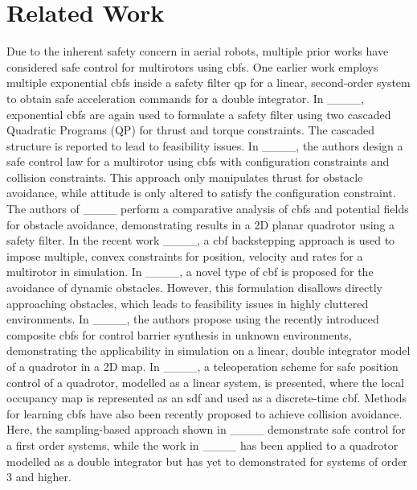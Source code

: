 \section{Related Work}
\label{sec:relatedwork}

Due to the inherent safety concern in aerial robots, multiple prior works have considered safe control for multirotors using \acp{cbf}. One earlier work employs multiple exponential \acp{cbf} inside a safety filter \ac{qp} for a linear, second-order system to obtain safe acceleration commands for a double integrator. In ____, exponential \acp{cbf} are again used to formulate a safety filter using two cascaded Quadratic Programs (QP) for thrust and torque constraints. The cascaded structure is reported to lead to feasibility issues. In ____, the authors design a safe control law for a multirotor using \acp{cbf} with configuration constraints and collision constraints. This approach only manipulates thrust for obstacle avoidance, while attitude is only altered to satisfy the configuration constraint.
The authors of ____ perform a comparative analysis of \acp{cbf} and potential fields for obstacle avoidance, demonstrating results in a 2D planar quadrotor using a safety filter.
In the recent work ____, a \ac{cbf} backstepping approach is used to impose multiple, convex constraints for position, velocity and rates for a multirotor in simulation. In ____, a novel type of \ac{cbf} is proposed for the avoidance of dynamic obstacles. However, this formulation disallows directly approaching obstacles, which leads to feasibility issues in highly cluttered environments.
In ____, the authors propose using the recently introduced composite \acp{cbf} for control barrier synthesis in unknown environments, demonstrating the applicability in simulation on a linear, double integrator model of a quadrotor in a 2D map.
In ____, a teleoperation scheme for safe position control of a quadrotor, modelled as a linear system, is presented, where the local occupancy map is represented as an \ac{sdf} and used as a discrete-time \ac{cbf}.
Methods for learning \acp{cbf} have also been recently proposed to achieve collision avoidance. Here, the sampling-based approach shown in ____ demonstrate safe control for a first order systems, while the work in ____ has been applied to a quadrotor modelled as a double integrator but has yet to demonstrated for systems of order 3 and higher.